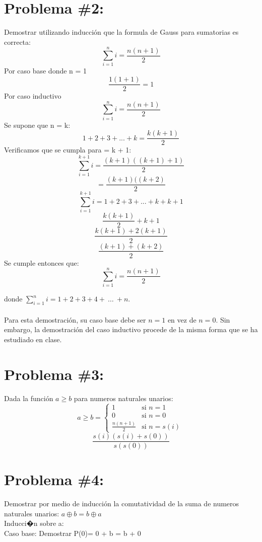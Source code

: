 \documentclass[12pt,letterpaper]{article}
\begin{document}
\section*{Problema \#2: }
Demostrar utilizando inducci\'on que la formula de Gauss para sumatorias es correcta:
\[
        \sum_{i=1}^{n}{i}=\frac{n(n+1)}{2}       
\]
Por caso base donde n = 1
\[ 
        \frac{1(1+1)}{2} =  1       
\]
Por caso inductivo
\[ 
        \sum_{i=1}^{n}{i}=\frac{n(n+1)}{2} 
\]
Se supone que n = k: 
\[        
        1+2+3+...+k=  \frac{k(k+1)}{2}    
\]
Verificamos que se cumpla para = k + 1: 
\[        
        \sum_{i=1}^{k+1}{i}=\frac{(k+1)((k+1)+1)}{2}       
\]
\[        
        =\frac{(k+1)((k+2)}{2}       
\]
\[        
		\sum_{i=1}^{k+1}{i}= 1+2+3+...+k+k+1       
\]
\[        
		\frac{k(k+1)}{2}  + k +1
\]
\[        
		\frac{k(k+1)+2(k+1)}{2}
\]
\[        
		\frac{(k+1)+(k+2)}{2}
\]
Se cumple entonces que: 
\[ 
        \sum_{i=1}^{n}{i}=\frac{n(n+1)}{2} 
\]

donde $\sum_{i=1}^{n}i=1+2+3+4+\ \ldots\ +n$.
\\\\
Para esta demostraci\'on, su caso base debe ser
$n=1$ en vez de $n=0$. Sin embargo, la demostraci\'on
del caso inductivo procede de la misma forma que
se ha estudiado en clase.
\section*{Problema \#3: }

Dada la funci\'on $a\geq b$ para numeros naturales unarios:
\[
        a\geq b =
                \left\{
                        \begin{array}{ll}
                                1  & \mbox{si } n = 1 \\
                                0 & \mbox{si } n = 0 \\
                                \frac{n(n+1)}{2} & \mbox{si } n = s(i)\ 
                        \end{array}
                \right.
\]
\[
        \frac{s(i)(s(i)+s(0))}{s(s(0))}
\]

\section*{Problema \#4: }
Demostrar por medio de inducci\'on la comutatividad de la suma de
numeros naturales unarios: $a\oplus b = b\oplus a$ \\

Inducci�n sobre a:\\
Caso base: Demostrar P(0)= 0 + b = b + 0
\end{document}

